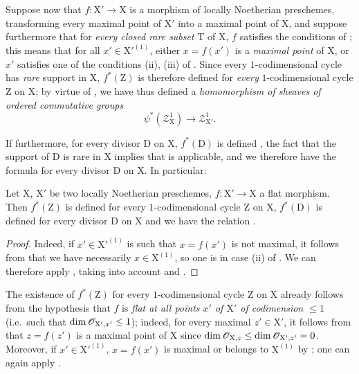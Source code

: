 \begin{env}[21.10.5]
\label{IV.21.10.5}
Suppose now that $f:\mathrm{X}'\to\mathrm{X}$ is a morphism of locally Noetherian preschemes, transforming every maximal point of $\mathrm{X}'$ into a maximal point of $\mathrm{X}$, and suppose furthermore that for \emph{every closed rare subset} $\mathrm{T}$ of $\mathrm{X}$, $f$ satisfies the conditions of ; this means that for all $x'\in\mathrm{X}'^{(1)}$, either $x=f(x')$ is a \emph{maximal point} of $\mathrm{X}$, or $x'$ satisfies one of the conditions (ii), (iii) of .
Since every $1$-codimensional cycle has \emph{rare} support in $\mathrm{X}$, $f^*(\mathrm{Z})$ is therefore defined for \emph{every} $1$-codimensional cycle $\mathrm{Z}$ on $\mathrm{X}$; by virtue of , we have thus defined a \emph{homomorphism of sheaves of ordered commutative groups}
\[
  \psi^*(\mathscr{Z}^1_{\mathrm{X}})\to\mathscr{Z}^1_{\mathrm{X}'}.
\]

If furthermore, for every divisor $\mathrm{D}$ on $\mathrm{X}$, $f^*(\mathrm{D})$ is defined , the fact that the support of $\mathrm{D}$ is rare in $\mathrm{X}$  implies that  is applicable, and we therefore have the formula  for every divisor $\mathrm{D}$ on $\mathrm{X}$.
In particular:
\end{env}

\begin{proposition}[21.10.6]
\label{IV.21.10.6}
Let $\mathrm{X}$, $\mathrm{X}'$ be two locally Noetherian preschemes, $f:\mathrm{X}'\to\mathrm{X}$ a flat morphism.
Then $f^*(\mathrm{Z})$ is defined for every $1$-codimensional cycle $\mathrm{Z}$ on $\mathrm{X}$, $f^*(\mathrm{D})$ is defined for every divisor $\mathrm{D}$ on $\mathrm{X}$ and we have the relation .
\end{proposition}

\begin{proof}
Indeed, if $x'\in\mathrm{X}'^{(1)}$ is such that $x=f(x')$ is not maximal, it follows from  that we have necessarily $x\in\mathrm{X}^{(1)}$, so one is in case (ii) of .
We can therefore apply , taking into account  and .
\end{proof}

\begin{remark}[21.10.7]
\label{IV.21.10.7}
The existence of $f^*(\mathrm{Z})$ for every $1$-codimensional cycle $\mathrm{Z}$ on $\mathrm{X}$ already follows from the hypothesis that $f$ is \emph{flat at all points $x'$ of $\mathrm{X}'$ of codimension $\leq 1$} (i.e.\ such that $\dim\mathscr{O}_{\mathrm{X}',x'}\leq 1$); indeed, for every maximal $z'\in\mathrm{X}'$, it follows from  that $z=f(z')$ is a maximal point of $\mathrm{X}$ since $\dim\mathscr{O}_{\mathrm{X},z}\leq\dim\mathscr{O}_{\mathrm{X}',z'}=0$.
Moreover, if $x'\in\mathrm{X}'^{(1)}$, $x=f(x')$ is maximal or belongs to $\mathrm{X}^{(1)}$ by ; one can again apply .
\end{remark}

